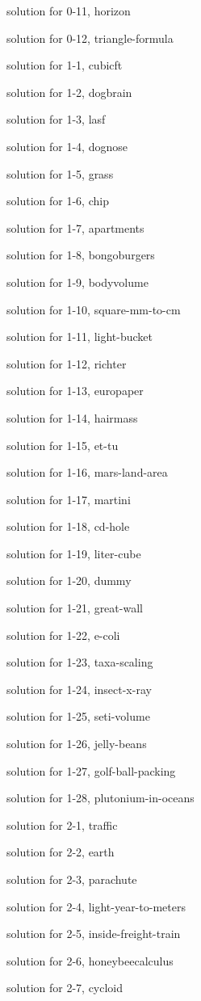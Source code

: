\documentclass{problems}
\begin{document}
solution for 0-11, horizon

solution for 0-12, triangle-formula

solution for 1-1, cubicft

solution for 1-2, dogbrain

solution for 1-3, lasf

solution for 1-4, dognose

solution for 1-5, grass

solution for 1-6, chip

solution for 1-7, apartments

solution for 1-8, bongoburgers

solution for 1-9, bodyvolume

solution for 1-10, square-mm-to-cm

solution for 1-11, light-bucket

solution for 1-12, richter

solution for 1-13, europaper

solution for 1-14, hairmass

solution for 1-15, et-tu

solution for 1-16, mars-land-area

solution for 1-17, martini

solution for 1-18, cd-hole

solution for 1-19, liter-cube

solution for 1-20, dummy

solution for 1-21, great-wall

solution for 1-22, e-coli

solution for 1-23, taxa-scaling

solution for 1-24, insect-x-ray

solution for 1-25, seti-volume

solution for 1-26, jelly-beans

solution for 1-27, golf-ball-packing

solution for 1-28, plutonium-in-oceans

solution for 2-1, traffic

solution for 2-2, earth

solution for 2-3, parachute

solution for 2-4, light-year-to-meters

solution for 2-5, inside-freight-train

solution for 2-6, honeybeecalculus

solution for 2-7, cycloid
\end{document}
